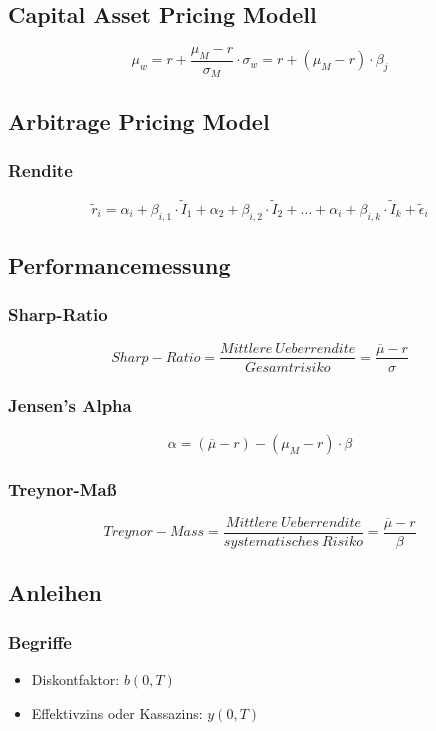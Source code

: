 \subsection{Capital Asset Pricing Modell}
\[\mu_w = r + \frac{\mu_M - r}{\sigma_M} \cdot \sigma_w = r + (\mu_M - r) \cdot \beta_j\]


\subsection{Arbitrage Pricing Model}

\subsubsection{Rendite}
\[\tilde{r}_i = \alpha_i + \beta_{i,1} \cdot \tilde{I}_1 + \alpha_2 + \beta_{i,2} \cdot \tilde{I}_2 + \dots + \alpha_i + \beta_{i,k} \cdot \tilde{I}_k + \tilde{\epsilon}_i\]


\subsection{Performancemessung}

\subsubsection{Sharp-Ratio}
\[Sharp-Ratio = \frac{Mittlere~Ueberrendite}{Gesamtrisiko} = \frac{\overline{\mu} - r}{\sigma}\]

\subsubsection{Jensen's Alpha}
\[\alpha = (\overline{\mu} - r) - (\mu_M - r) \cdot \beta\]

\subsubsection{Treynor-Maß}
\[Treynor-Mass = \frac{Mittlere~Ueberrendite}{systematisches~Risiko} = \frac{\overline{\mu} - r}{\beta}\]


\subsection{Anleihen}

\subsubsection{Begriffe}
\begin{itemize}
	\item Diskontfaktor: \(b(0,T)\)
	\item Effektivzins oder Kassazins: \(y(0,T)\)
\end{itemize}

